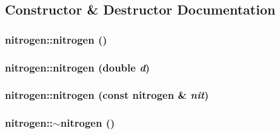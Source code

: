 \subsection{Constructor \& Destructor Documentation}
\hypertarget{classnitrogen_a9316a74410e242fb4835a9845081ed8a}{
\subsubsection[{nitrogen}]{\setlength{\rightskip}{0pt plus 5cm}nitrogen::nitrogen ()}}
\label{classnitrogen_a9316a74410e242fb4835a9845081ed8a}
\hypertarget{classnitrogen_a98e9cff6222ee7214e4fb7247b38c83c}{
\subsubsection[{nitrogen}]{\setlength{\rightskip}{0pt plus 5cm}nitrogen::nitrogen (double {\em d})}}
\label{classnitrogen_a98e9cff6222ee7214e4fb7247b38c83c}
\hypertarget{classnitrogen_ab36e1732c3e534d712a999c79c01f284}{
\subsubsection[{nitrogen}]{\setlength{\rightskip}{0pt plus 5cm}nitrogen::nitrogen (const {\bf nitrogen} \& {\em nit})}}
\label{classnitrogen_ab36e1732c3e534d712a999c79c01f284}
\hypertarget{classnitrogen_aa7a148b2155165270fcafb9d202a0fc0}{
\subsubsection[{$\sim$nitrogen}]{\setlength{\rightskip}{0pt plus 5cm}nitrogen::$\sim$nitrogen ()}}
\label{classnitrogen_aa7a148b2155165270fcafb9d202a0fc0}


